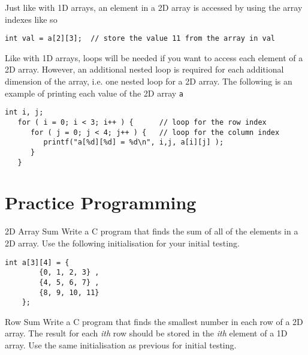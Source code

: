 \documentclass{pass}
\begin{document}
Just like with 1D arrays, an element in a 2D array is accessed by using the array indexes like so
\begin{lstlisting}[style=CStyle]
	int val = a[2][3];	// store the value 11 from the array in val
\end{lstlisting}

Like with 1D arrays, loops will be needed if you want to access each element of a 2D array. However, an additional nested loop is required for each additional dimension of the array, i.e. one nested loop for a 2D array. The following is an example of printing each value of the 2D array \texttt{a}
\begin{lstlisting}[style=CStyle]
   int i, j;
   for ( i = 0; i < 3; i++ ) {		// loop for the row index
      for ( j = 0; j < 4; j++ ) {	// loop for the column index
         printf("a[%d][%d] = %d\n", i,j, a[i][j] );
      }
   }
\end{lstlisting}

\pagebreak

\section*{Practice Programming}
\begin{task}{2D Array Sum}{}
Write a C program that finds the sum of all of the elements in a 2D array. Use the following initialisation for your initial testing.
\begin{lstlisting}[style=CStyle]
	int a[3][4] = {  
		{0, 1, 2, 3} ,
		{4, 5, 6, 7} ,   
		{8, 9, 10, 11}   
	};
\end{lstlisting}

\end{task}

\begin{task}{Row Sum}{}
Write a C program that finds the smallest number in each row of a 2D array. The result for each \textit{ith} row should be stored in the \textit{ith} element of a 1D array. Use the same initialisation as previous for initial testing.

\end{task}
\end{document}
